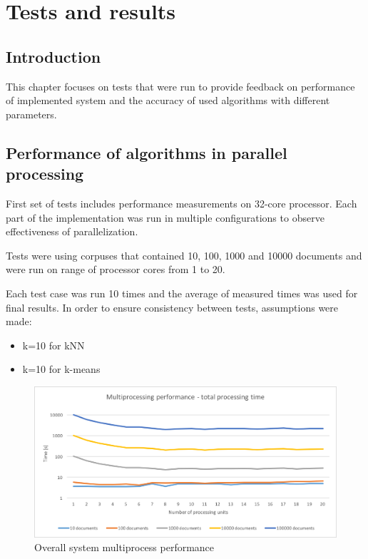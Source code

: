 \chapter{Tests and results} \label{tests}
\section{Introduction}
This chapter focuses on tests that were run to provide feedback on performance of implemented system and the accuracy of used algorithms with different parameters. 

\section{Performance of algorithms in parallel processing} \label{parallel-performance}
First set of tests includes performance measurements on 32-core processor. Each part of the implementation was run in multiple configurations to observe effectiveness of parallelization.

Tests were using corpuses that contained 10, 100, 1000 and 10000 documents and were run on range of processor cores from 1 to 20.

Each test case was run 10 times and the average of measured times was used for final results. In order to ensure consistency between tests, assumptions were made:
\begin{itemize}
	\item k=10 for kNN
	\item k=10 for k-means
\end{itemize}

\begin{figure}[ht]
\begin{center}
 \includegraphics[width=0.9\linewidth]{images/tests/mp-total-sum.png}
 \caption{Overall system multiprocess performance }
 \label{mp-total-sum}
 \end{center}
 \end{figure}
 
